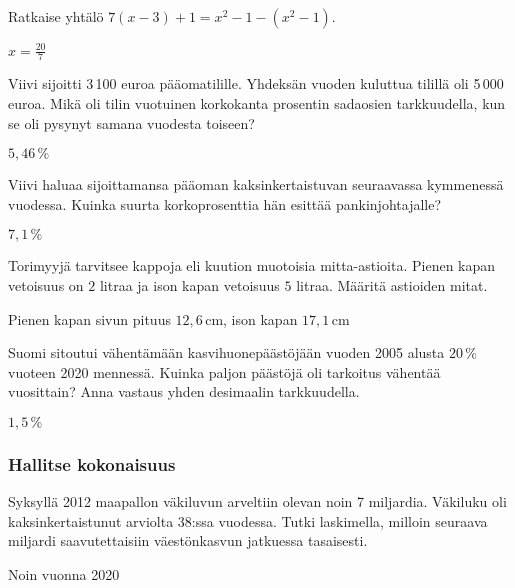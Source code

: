 \begin{tehtavasivu}
\begin{tehtava}
	Ratkaise yhtälö $7(x-3)+1=x^2-1-(x^2-1)$.
    \begin{vastaus}
	$x=\frac{20}{7}$
    \end{vastaus}
\end{tehtava}

\begin{tehtava}%
Viivi sijoitti 3\,100 euroa pääomatilille. Yhdeksän vuoden kuluttua tilillä oli 5\,000 euroa. Mikä oli tilin vuotuinen korkokanta prosentin sadaosien tarkkuudella, kun se oli pysynyt samana vuodesta toiseen? 
\begin{vastaus}
$5,46\,\%$
\end{vastaus}
\end{tehtava}
\begin{tehtava}%
Viivi haluaa sijoittamansa pääoman kaksinkertaistuvan seuraavassa kymmenessä vuodessa. Kuinka suurta korkoprosenttia hän esittää pankinjohtajalle?
\begin{vastaus}
$7,1\,\%$
\end{vastaus}
\end{tehtava}

\begin{tehtava}%
Torimyyjä tarvitsee kappoja eli kuution muotoisia mitta-astioita. Pienen kapan vetoisuus on $2$ litraa ja ison kapan vetoisuus $5$ litraa. Määritä astioiden mitat.
\begin{vastaus}
Pienen kapan sivun pituus $12,6$\,cm, ison kapan $17,1$\,cm
\end{vastaus}
\end{tehtava}

\begin{tehtava}%
Suomi sitoutui vähentämään kasvihuonepäästöjään vuoden 2005 alusta $20\,\%$ vuoteen 2020 mennessä. Kuinka paljon päästöjä oli tarkoitus vähentää vuosittain? Anna vastaus yhden desimaalin tarkkuudella. %
\begin{vastaus}
$1,5\,\%$
\end{vastaus}
\end{tehtava}


\subsubsection*{Hallitse kokonaisuus}
\begin{tehtava}%
Syksyllä 2012 maapallon väkiluvun arveltiin olevan noin 7 miljardia. Väkiluku oli kaksinkertaistunut arviolta 38:ssa vuodessa. Tutki laskimella, milloin seuraava miljardi saavutettaisiin väestönkasvun jatkuessa tasaisesti.
\begin{vastaus}
Noin vuonna 2020
\end{vastaus}
\end{tehtava}


\end{tehtavasivu}

